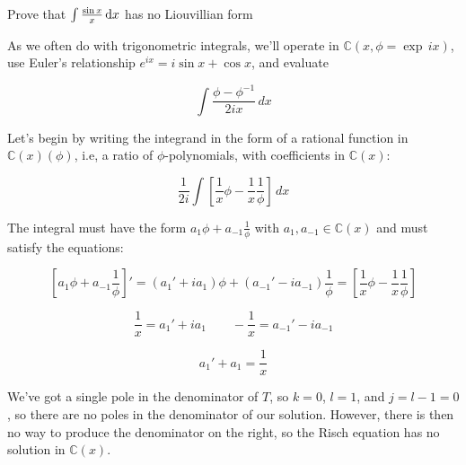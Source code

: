 \endexample


\example Prove that $\int \frac{\sin x}{x} \, {\rm d}x$ has no Liouvillian form

As we often do with trigonometric integrals, we'll operate in
${\mathbb C}(x, \phi = \exp \,ix)$, use Euler's relationship
$e^{ix}=i\sin x + \cos x$, and evaluate

$$\int \frac{\phi - \phi^{-1}}{2ix} \,dx$$

Let's begin by writing the integrand in the form of a rational
function in ${\mathbb C}(x)(\phi)$, i.e, a ratio
of $\phi$-polynomials, with coefficients in ${\mathbb C}(x)$:

$$\frac{1}{2i} \int \left[ \frac{1}{x}\phi - \frac{1}{x}\frac{1}{\phi} \right]\,dx$$

\begin{comment}
We want to split the denominator into its normal and special
components, by factoring it into irreducible polynomials and
classifying each one as normal or special.  In this case, the
factoriziation is trivial, and we know from theorem \ref{basic
exponential properties} that $\phi$ is special.

Can we have any logarithms in our integral?  Let's see.
Any logarithm of a rational function can be factored and
split into separate logarithms using basic properties
of a logarithms:

$$\ln ab = \ln a + \ln b \qquad\qquad \ln\frac{a}{b} = \ln a - \ln b$$

So, we need only consider logarithms of irreducible polynomials.

Theorem \ref{basic exponential properties} also tells us that we can
have no normal polynomials in denominator of our integral,
\end{comment}


The integral must have the form $a_1 \phi + a_{-1} \frac{1}{\phi}$
with $a_1, a_{-1} \in {\mathbb C}(x)$ and must satisfy the equations:

$$\left[ a_1 \phi + a_{-1}\frac{1}{\phi} \right]' = (a_1' + i a_1 ) \phi + (a_{-1}' - i a_{-1} ) \frac{1}{\phi}
= \left[ \frac{1}{x}\phi - \frac{1}{x}\frac{1}{\phi} \right]$$

$$\frac{1}{x} = a_1' + i a_1 \qquad - \frac{1}{x} = a_{-1}' - i a_{-1}$$

$$a_1' + a_1 = \frac{1}{x}$$

We've got a single pole in the denominator of $T$, so $k=0$, $l=1$,
and $j=l-1=0$, so there are no poles in the denominator of our solution.
However, there is then no way to produce the denominator on the
right, so the Risch equation has no solution in ${\mathbb C}(x)$.


